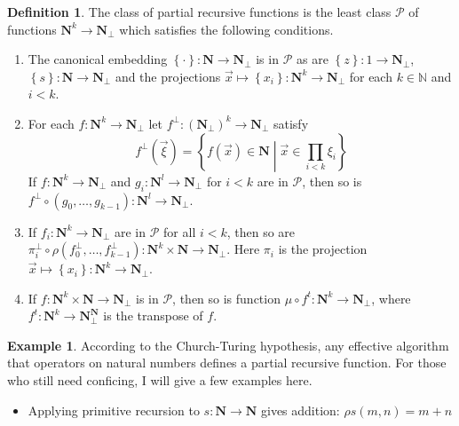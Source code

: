 \documentclass{amsart}
\theoremstyle{plain}
\theoremstyle{definition}
\newtheorem{defin}[theorem]{Definition}
\newtheorem{example}[theorem]{Example}
\newcommand\hide[1]{}
\newcommand\cat\mathcal
\newcommand\set[1]{\left\{#1\right\}}
\newcommand\id{\mathrm{id}}
\newcommand\XN{\mathbb N}
\newcommand\N{\mathbf N}
\begin{document}
\begin{defin} The class of partial recursive functions is the least class $\cat P$ of functions $\N^k \to \N_\bot$ which satisfies the following conditions.
\begin{enumerate}
\item The canonical embedding $\set\cdot:\N\to\N_\bot$ is in $\cat P$ as are $\set z:1\to\N_\bot$, $\set s:\N \to \N_\bot$ and the projections $\vec x \mapsto \set{x_i}:\N
^k \to \N_\bot$ for each $k\in \XN$ and $i<k$.
\item For each $f:\N^k\to \N_\bot$ let $f^\bot:(\N_\bot)^k\to \N_\bot$ satisfy 
\[ f^\bot(\vec \xi) = \set{f(\vec x)\in \N \middle| \vec x \in \prod_{i<k}\xi_i} \]
If $f:\N^k\to \N_\bot$ and $g_i:\N^l\to\N_\bot$ for $i<k$ are in $\cat P$, then so is $f^\bot\circ(g_0,\dotsc,g_{k-1}):\N^l\to\N_\bot$.
\hide{\item For each $f:\N^k \to \N_\bot$ and each $g:\N^{k+2} \times \N_\bot$ in $\cat P$ the following morphism $h:\N^{k+1} \to\N_\bot$ is in $\cat P$:
\[ \xymatrix{
\N^{k+1} \ar@{.>}[d]_h \ar[r]^(.4){(\id,f,z)} & (\N_\bot)^{k+2}\times \N\ar[r]^{\id\times s} \ar[d]|{\rho((\pi_{0\dotsm(k-2)}, g)_\bot)}& (\N_\bot)^{k+2}\times \N \ar[d]^{\rho((\pi_{0\dotsm(k-2)},g)_\bot)}\\
\N_\bot & (\N_\bot)^{k+1} \ar[l]^{(\pi_{k-1})_\bot} \ar[r]_{(\pi_{0\dotsm(k-2)}, g)_\bot} & (\N_\bot)^{k+1}
}\]
Here $\pi_{0\dotsm(k-2)}$ is the projection to the first $k-1$ coordinates and $\pi_{k-1}$ is the projection to the last coordinate.
}
\item If $f_i:\N^k \to \N_\bot$ are in $\cat P$ for all $i<k$, then so are $\pi_i^\bot\circ \rho(f_0^\bot,\dotsc,f_{k-1}^\bot):\N^k\times\N \to \N_\bot$. Here $\pi_i$ is the projection $\vec x\mapsto \set{x_i}:\N^k \to \N_\bot$.
\item If $f:\N^k\times \N \to \N_\bot$ is in $\cat P$, then so is function $\mu \circ f^t: \N^k \to \N_\bot$, where $f^t:\N^k \to \N_\bot^\N$ is the transpose of $f$.
\end{enumerate}
\end{defin}

\begin{example} According to the Church-Turing hypothesis, any effective algorithm that operators on natural numbers defines a partial recursive function. For those who still need conficing, I will give a few examples here.
\begin{itemize}
\item Applying primitive recursion to $s:\N\to\N$ gives addition: $\rho s(m,n) = m+n$
\end{itemize}
\end{example}
\end{document}
